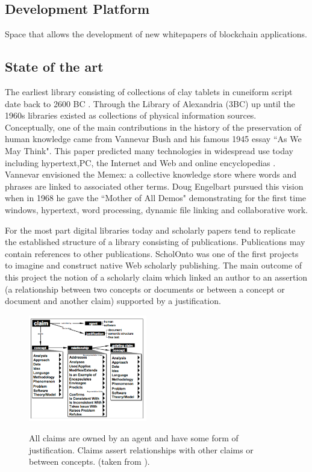 \documentclass[twoside,twocolumn]{article}
\begin{document}
\subsection{Development Platform}
Space that allows the development of new whitepapers of blockchain applications.
 
\subsection{State of the art} 
The earliest library consisting of collections of clay tablets in cuneiform script date back to 2600 BC \cite{History_of_Libraries2016}. Through the Library of Alexandria (3BC) up until the 1960s libraries existed as collections of physical information sources. Conceptually, one of the main contributions in the history of the preservation of human knowledge came from Vannevar Bush and his famous 1945 essay ``As We May Think". This paper predicted many technologies in widespread use today including hypertext,PC, the Internet and Web and online encyclopedias \cite{As_We_May_Think2016}. Vannevar envisioned the Memex: a collective knowledge store where words and phrases are linked to associated other terms. Doug Engelbart pursued this vision when in 1968 he gave the ``Mother of All Demos" \cite{Mother_of_All_Demos2016} demonstrating for the first time windows, hypertext, word processing, dynamic file linking and collaborative work. 

For the most part digital libraries today and scholarly papers tend to replicate the established structure of a library consisting of publications. Publications may contain references to other publications. ScholOnto \cite{shum2000scholonto,  Scholonto2016} was one of the first projects to imagine and construct native Web scholarly publishing. The main outcome of this project the notion of a scholarly claim which linked an author to an assertion (a relationship between two concepts or documents or between a concept or document and another claim) supported by a justification. 

\begin{figure}[htbp]\centering
\caption{All claims are owned by an agent and have some form of justification. Claims assert relationships with other claims or between concepts. (taken from \cite{shum2000scholonto}).}
\includegraphics[width=0.46\textwidth]{scholonto-image}
\label{fig:scholonto}

\end{figure}
\end{document}
